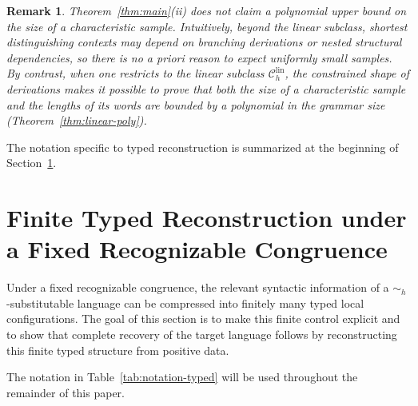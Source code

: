 \documentclass[11pt,a4paper]{article}
\newtheorem{remark}[theorem]{Remark}
\newcommand{\lin}{\mathrm{lin}}
\newcommand{\Clin}[1]{\mathcal C_{#1}^{\lin}}
\begin{document}
\begin{remark}\label{rem:main-poly-caveat}
Theorem~\ref{thm:main}\textup{(ii)} does \emph{not} claim a polynomial
upper bound on the size of a characteristic sample. Intuitively, beyond
the linear subclass, shortest distinguishing contexts may depend on
branching derivations or nested structural dependencies, so there is no
a priori reason to expect uniformly small samples. By contrast, when one
restricts to the linear subclass $\Clin{h}$, the constrained shape of
derivations makes it possible to prove that both the size of a
characteristic sample and the lengths of its words are bounded by a
polynomial in the grammar size (Theorem~\ref{thm:linear-poly}).
\end{remark}

The notation specific to typed reconstruction is summarized at the
beginning of Section~\ref{sec:typing}.

\section{Finite Typed Reconstruction under a Fixed Recognizable Congruence}
\label{sec:typing}

Under a fixed recognizable congruence, the relevant syntactic
information of a $\sim_h$-substitutable language can be compressed into
finitely many typed local configurations. The goal of this section is to
make this finite control explicit and to show that complete recovery of
the target language follows by reconstructing this finite typed
structure from positive data.

The notation in Table~\ref{tab:notation-typed} will be used throughout the remainder of this paper.
\end{document}

